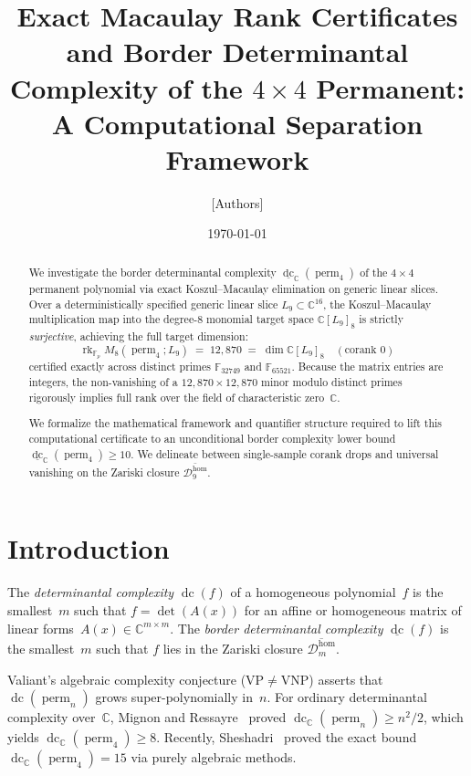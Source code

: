 \documentclass[11pt,a4paper]{amsart}
\title[Exact Macaulay Certificates for $\perm_4$ Border Complexity]{Exact Macaulay Rank Certificates and Border Determinantal Complexity of the $4 \times 4$ Permanent: A Computational Separation Framework}
\author{[Authors]}
\date{\today}
\newcommand{\perm}{\operatorname{perm}}
\newcommand{\DC}{\operatorname{dc}}
\newcommand{\bDC}{\underline{\operatorname{dc}}}
\newcommand{\rk}{\operatorname{rk}}
\newcommand{\CC}{\mathbb{C}}
\newcommand{\FF}{\mathbb{F}}
\newcommand{\calD}{\mathcal{D}}
\theoremstyle{definition}
\begin{document}
\begin{abstract}
We investigate the border determinantal complexity $\bDC_\CC(\perm_4)$ of the $4\times 4$
permanent polynomial via exact Koszul--Macaulay elimination on generic linear slices.
Over a deterministically specified generic linear slice $L_9 \subset \CC^{16}$, the Koszul--Macaulay
multiplication map into the degree-$8$ monomial target space $\CC[L_9]_8$ is strictly
\emph{surjective}, achieving the full target dimension:
\[
  \rk_{\FF_p} M_8(\perm_4; L_9) \;=\; 12{,}870 \;=\; \dim \CC[L_9]_8 \quad (\text{corank } 0)
\]
certified exactly across distinct primes $\FF_{32749}$ and $\FF_{65521}$.
Because the matrix entries are integers, the non-vanishing of a $12{,}870 \times 12{,}870$ minor
modulo distinct primes rigorously implies full rank over the field of characteristic zero~$\CC$.

We formalize the mathematical framework and quantifier structure required to lift this
computational certificate to an unconditional border complexity lower bound $\bDC_\CC(\perm_4) \ge 10$.
We delineate between single-sample corank drops and universal vanishing on the Zariski
closure $\overline{\calD_9^{\mathrm{hom}}}$.
\end{abstract}

\maketitle

\section{Introduction}

The \emph{determinantal complexity} $\DC(f)$ of a homogeneous polynomial~$f$ is the
smallest~$m$ such that $f = \det(A(x))$ for an affine or homogeneous matrix of linear
forms~$A(x) \in \CC^{m \times m}$. The \emph{border determinantal complexity} $\bDC(f)$
is the smallest~$m$ such that $f$ lies in the Zariski closure $\overline{\calD_m^{\mathrm{hom}}}$.

Valiant's algebraic complexity conjecture ($\mathrm{VP} \ne \mathrm{VNP}$) asserts that
$\DC(\perm_n)$ grows super-polynomially in~$n$. For ordinary determinantal complexity over~$\CC$,
Mignon and Ressayre~\cite{MR04} proved $\DC_\CC(\perm_n) \ge n^2/2$, which yields $\DC_\CC(\perm_4) \ge 8$.
Recently, Sheshadri~\cite{Sheshadri25} proved the exact bound $\DC_\CC(\perm_4) = 15$ via
purely algebraic methods.
\end{document}
